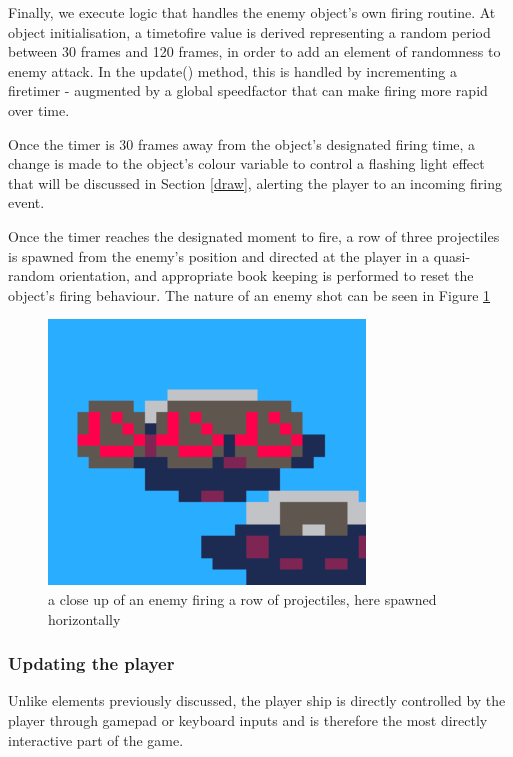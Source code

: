 \documentclass[11pt]{article}
\begin{document}
Finally, we execute logic that handles the enemy object's own firing routine. At object initialisation,
a time\textunderscore to\textunderscore fire value is derived representing a random period between
30 frames and 120 frames, in order to add an element of randomness to enemy attack. In the update()
method, this is handled by incrementing a fire\textunderscore timer - augmented by a global
speed\textunderscore factor that can make firing more rapid over time. 

Once the timer is 30 frames away from the object's designated firing time, a change is made to the
object's colour variable to control a flashing light effect that will be discussed in Section \ref{draw},
alerting the player to an incoming firing event.

Once the timer reaches the designated moment to fire, a row of three projectiles is spawned
from the enemy's position and directed at the player in a quasi-random orientation, and appropriate book
keeping is performed to reset the object's firing behaviour. The nature of an enemy shot can be
seen in Figure \ref{fig:enemyfire}

\begin{figure}[h]
    \centering
    \includegraphics[width=.8\textwidth]{enemy_fire}
    \caption{a close up of an enemy firing a row of projectiles, here spawned horizontally}
    \label{fig:enemyfire}
\end{figure}

\subsubsection*{Updating the player}

Unlike elements previously discussed, the player ship is directly controlled by the player through
gamepad or keyboard inputs and is therefore the most directly interactive part of the game.
\end{document}
